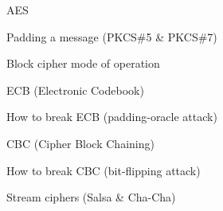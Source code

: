 \begin{frame}{AES}

\end{frame}

\begin{frame}{Padding a message (PKCS\#5 \& PKCS\#7)}

\end{frame}

\begin{frame}{Block cipher mode of operation}

\end{frame}

\begin{frame}{ECB (Electronic Codebook)}

\end{frame}

\begin{frame}{How to break ECB (padding-oracle attack)}

\end{frame}

\begin{frame}{CBC (Cipher Block Chaining)}

\end{frame}

\begin{frame}{How to break CBC (bit-flipping attack)}

\end{frame}

\begin{frame}{Stream ciphers (Salsa \& Cha-Cha)}

\end{frame}
